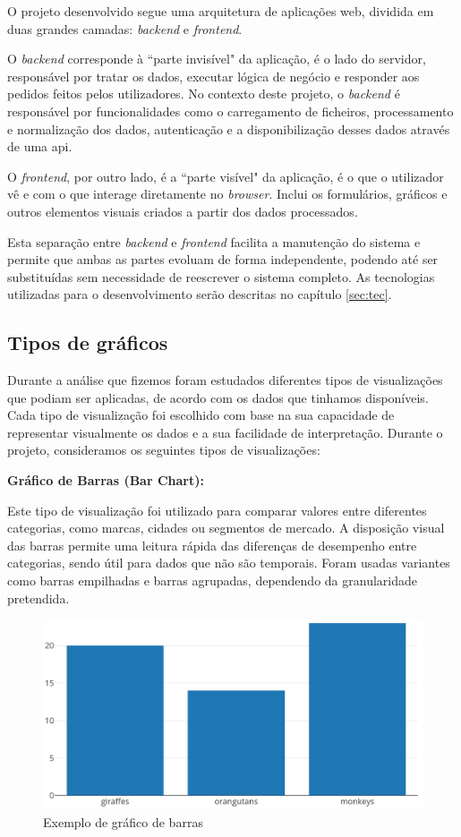 O projeto desenvolvido segue uma arquitetura de aplicações web, dividida em duas grandes camadas: \textit{backend} e \textit{frontend}.

O \textit{backend} corresponde à ``parte invisível" da aplicação, é o lado do servidor, responsável por tratar os dados, executar lógica de negócio e responder aos pedidos feitos pelos utilizadores. No contexto deste projeto, o \textit{backend} é responsável por funcionalidades como o carregamento de ficheiros, processamento e normalização dos dados, autenticação e a disponibilização desses dados através de uma \gls{api}.

O \textit{frontend}, por outro lado, é a ``parte visível" da aplicação, é o que o utilizador vê e com o que interage diretamente no \textit{browser}. Inclui os formulários, gráficos e outros elementos visuais criados a partir dos dados processados.

Esta separação entre \textit{backend} e \textit{frontend} facilita a manutenção do sistema e permite que ambas as partes evoluam de forma independente, podendo até ser substituídas sem necessidade de reescrever o sistema completo. As tecnologias utilizadas para o desenvolvimento serão descritas no capítulo \ref{sec:tec}.

\subsection{Tipos de gráficos}

Durante a análise que fizemos foram estudados diferentes tipos de visualizações que podiam ser aplicadas, de acordo com os dados que tinhamos disponíveis. Cada tipo de visualização foi escolhido com base na sua capacidade de representar visualmente os dados e a sua facilidade de interpretação. Durante o projeto, consideramos os seguintes tipos de visualizações:

\textbf{Gráfico de Barras (Bar Chart):}

Este tipo de visualização foi utilizado para comparar valores entre diferentes categorias, como marcas, cidades ou segmentos de mercado. A disposição visual das barras permite uma leitura rápida das diferenças de desempenho entre categorias, sendo útil para dados que não são temporais. Foram usadas variantes como barras empilhadas e barras agrupadas, dependendo da granularidade pretendida.

\begin{figure}[H]
\centering
\includegraphics[max width=12cm, keepaspectratio]{./img/barras1}
\caption{Exemplo de gráfico de barras}
\end{figure}
\noindent

